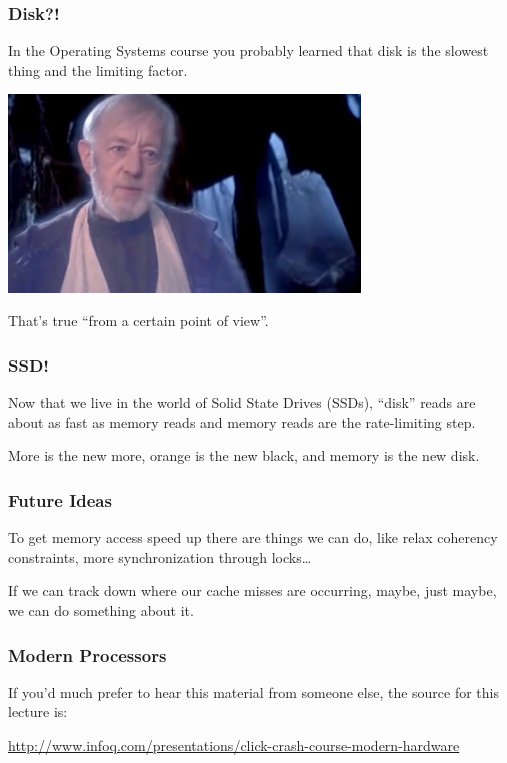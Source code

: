 \begin{frame}
\frametitle{Disk?!}

In the Operating Systems course you probably learned that disk is the slowest thing and the limiting factor. 

\begin{center}
	\includegraphics[width=0.7\textwidth]{images/obiwan.jpg}
\end{center}

That's true ``from a certain point of view''. 

\end{frame}


\begin{frame}
\frametitle{SSD!}

Now that we live in the world of Solid State Drives (SSDs), ``disk'' reads are about as fast as memory reads and memory reads are the rate-limiting step. 

More is the new more, orange is the new black, and memory is the new disk.

\end{frame}



\begin{frame}
\frametitle{Future Ideas}

To get memory access speed up there are things we can do, like relax coherency constraints, more synchronization through locks\ldots 


If we can track down where our cache misses are occurring, maybe, just maybe, we can do something about it. 


\end{frame}


\begin{frame}
\frametitle{Modern Processors}

If you'd much prefer to hear this material from someone else, the source for this lecture is:

\begin{center}
\url{http://www.infoq.com/presentations/click-crash-course-modern-hardware}
\end{center}

\end{frame}

